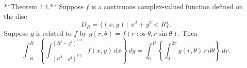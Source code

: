 **Theorem 7.4.** Suppose $f$ is a continuous complex-valued function defined on the disc
$$
D_R = \{(x, y) \mid x^2 + y^2 < R\}.
$$
Suppose $g$ is related to $f$ by $g(r, \theta) = f(r \cos \theta, r \sin \theta)$. Then
$$
\int_{-R}^{R} \left\{ \int_{-(R^2 - y^2)^{1/2}}^{(R^2 - y^2)^{1/2}} f(x, y) \, dx \right\} \, dy = \int_{0}^{R} \left\{ \int_{0}^{2\pi} g(r, \theta) \, r \, d\theta \right\} \, dr.
$$
